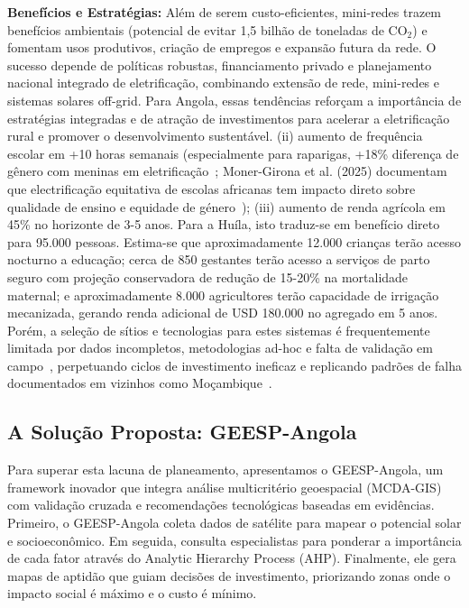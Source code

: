 \documentclass[12pt, a4paper]{article}
\begin{document}
\textbf{Benefícios e Estratégias:} Além de serem custo-eficientes, mini-redes trazem benefícios ambientais (potencial de evitar 1,5 bilhão de toneladas de CO$_2$) e fomentam usos produtivos, criação de empregos e expansão futura da rede. O sucesso depende de políticas robustas, financiamento privado e planejamento nacional integrado de eletrificação, combinando extensão de rede, mini-redes e sistemas solares off-grid. Para Angola, essas tendências reforçam a importância de estratégias integradas e de atração de investimentos para acelerar a eletrificação rural e promover o desenvolvimento sustentável.
(ii) aumento de frequência escolar em +10 horas semanais (especialmente para raparigas, +18\% diferença de gênero com meninas em eletrificação~\citep{Clark2021}; Moner-Girona et al. (2025) documentam que electrificação equitativa de escolas africanas tem impacto direto sobre qualidade de ensino e equidade de género~\citep{Moner2025});
(iii) aumento de renda agrícola em 45\% no horizonte de 3-5 anos. Para a Huíla, isto traduz-se em benefício direto para 95.000 pessoas. Estima-se que aproximadamente 12.000 crianças terão acesso nocturno a educação; cerca de 850 gestantes terão acesso a serviços de parto seguro com projeção conservadora de redução de 15-20\% na mortalidade maternal; e aproximadamente 8.000 agricultores terão capacidade de irrigação mecanizada, gerando renda adicional de USD 180.000 no agregado em 5 anos. Porém, a seleção de sítios e tecnologias para estes sistemas é frequentemente limitada por dados incompletos, metodologias ad-hoc e falta de validação em campo~\citep{IRENA2022, Lazard2023}, perpetuando ciclos de investimento ineficaz e replicando padrões de falha documentados em vizinhos como Moçambique~\citep{Ahlborg2014}.

\subsection{A Solução Proposta: GEESP-Angola}
Para superar esta lacuna de planeamento, apresentamos o GEESP-Angola, um framework inovador que integra análise multicritério geoespacial (MCDA-GIS) com validação cruzada e recomendações tecnológicas baseadas em evidências. Primeiro, o GEESP-Angola coleta dados de satélite para mapear o potencial solar e socioeconômico. Em seguida, consulta especialistas para ponderar a importância de cada fator através do Analytic Hierarchy Process (AHP). Finalmente, ele gera mapas de aptidão que guiam decisões de investimento, priorizando zonas onde o impacto social é máximo e o custo é mínimo.
\end{document}
